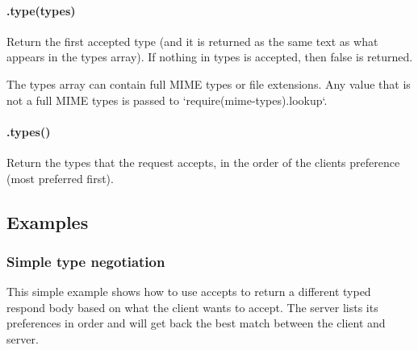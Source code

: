 \paragraph*{.type(types)}

Return the first accepted type (and it is returned as the same text as what appears in the {\ttfamily types} array). If nothing in {\ttfamily types} is accepted, then {\ttfamily false} is returned.

The {\ttfamily types} array can contain full M\+I\+M\+E types or file extensions. Any value that is not a full M\+I\+M\+E types is passed to `require(\textquotesingle{}mime-\/types\textquotesingle{}).lookup`.

\paragraph*{.types()}

Return the types that the request accepts, in the order of the client\textquotesingle{}s preference (most preferred first).

\subsection*{Examples}

\subsubsection*{Simple type negotiation}

This simple example shows how to use {\ttfamily accepts} to return a different typed respond body based on what the client wants to accept. The server lists it\textquotesingle{}s preferences in order and will get back the best match between the client and server.


